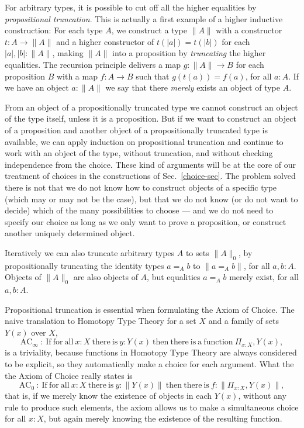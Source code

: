 \documentclass{amsart}
\theoremstyle{plain}
\numberwithin{equation}{section} %
\numberwithin{figure}{section} %
\theoremstyle{plain}
\theoremstyle{plain}
\theoremstyle{plain}
\theoremstyle{plain}
\theoremstyle{plain}
\theoremstyle{plain}
\theoremstyle{remark}
\theoremstyle{remark}
\theoremstyle{remark}
\begin{document}

For arbitrary types, it is possible to cut off all the higher equalities by \textit{propositional truncation}. This is actually a first example of a higher inductive construction: For each type $A$, we construct a type $\| A \|$ with a constructor $t : A \rightarrow \| A \|$ and a higher constructor of $t(|a|) = t(|b|)$ for each $|a|, |b| : \| A \|$, making $\| A \|$ into a proposition by \textit{truncating} the higher equalities. The recursion principle delivers a map $g : \| A \| \rightarrow B$ for each proposition $B$ with a map $f : A \rightarrow B$ such that $g(t(a)) = f(a)$, for all $a : A$. 
If we have an object $a : \| A \|$ we say that there \textit{merely} exists an object of type $A$.

From an object of a propositionally truncated type we cannot construct an object of the type itself, unless it is a proposition. But if we want to construct an object of a proposition and another object of a propositionally truncated type is available, we can apply induction on propositional truncation and continue to work with an object of the type, without truncation, and without checking independence from the choice. These kind of arguments will be at the core of our treatment of choices in the constructions of Sec.~\ref{choice-sec}. The problem solved there is not that we do not know how to construct objects of a specific type (which may or may not be the case), but that we do not know (or do not want to decide) which of the many possibilities to choose --- and we do not need to specify our choice as long as we only want to prove a proposition, or construct another uniquely determined object.

Iteratively we can also truncate arbitrary types $A$ to sets $\| A \|_0$, by propositionally truncating the identity types $a =_A b$ to $\| a =_A b \|$, for all $a, b : A$. Objects of $\| A \|_0$ are also objects of $A$, but equalities $a =_A b$ merely exist, for all $a, b : A$.

Propositional truncation is essential when formulating the Axiom of Choice. The naive translation to Homotopy Type Theory for a set $X$ and a family of sets $Y(x)$ over $X$,
\[ \mathrm{AC}_\infty\ :\ \mathrm{If\ for\ all\ } x : X\ \mathrm{there\ is\ } y : Y(x)\ \mathrm{then\ there\ is\ a\ function\ } \Pi_{x : X}, Y(x), \]
is a triviality, because functions in Homotopy Type Theory are always considered to be explicit, so they automatically make a choice for each argument. What the the Axiom of Choice really states is
\[ \mathrm{AC}_0\ :\ \mathrm{If\ for\ all\ } x : X\ \mathrm{there\ is\ } y : \| Y(x) \|\ \mathrm{then\ there\ is\ } f : \| \Pi_{x : X}, Y(x) \|, \]
that is, if we merely know the existence of objects in each $Y(x)$, without any rule to produce such elements, the axiom allows us to make a simultaneous choice for all $x : X$, but again merely knowing the existence of the resulting function.
\end{document}

